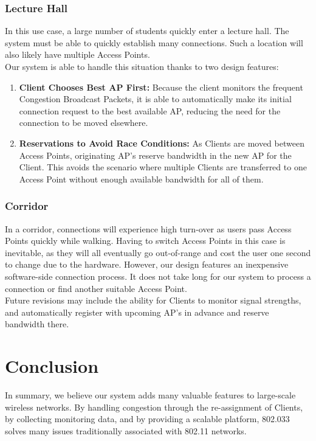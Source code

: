 \documentclass[11pt,twocolumn]{article}
\begin{document}
\subsubsection{Lecture Hall}
\indent In this use case, a large number of students quickly enter a lecture hall. The system must be able to quickly establish many connections. Such a location
will also likely have multiple Access Points. \\
\indent Our system is able to handle this situation thanks to two design features:
\begin{enumerate}
	\item \textbf{Client Chooses Best AP First:} Because the client monitors the frequent Congestion Broadcast Packets, it is able to automatically make its
	initial connection request to the best available AP, reducing the need for the connection to be moved elsewhere.
	\item \textbf{Reservations to Avoid Race Conditions:} As Clients are moved between Access Points, originating AP's reserve bandwidth in the new AP for the
	Client. This avoids the scenario where multiple Clients are transferred to one Access Point without enough available bandwidth for all of them.
\end{enumerate}
\subsubsection{Corridor}
\indent In a corridor, connections will experience high turn-over as users pass Access Points quickly while walking. Having to switch Access Points in this case
is inevitable, as they will all eventually go out-of-range and cost the user one second to change due to the hardware. However, our design features an 
inexpensive software-side connection process. It does not take long for our system to process a connection or find another suitable Access Point.\\
\indent Future revisions may include the ability for Clients to monitor signal strengths, and automatically register with upcoming AP's in advance and reserve bandwidth there.

\section{Conclusion}
\indent In summary, we believe our system adds many valuable features to large-scale wireless networks. By handling congestion through the re-assignment of Clients, by collecting monitoring data, and by providing a scalable platform, 802.033 solves many issues traditionally associated with 802.11 networks. 
\end{document}
